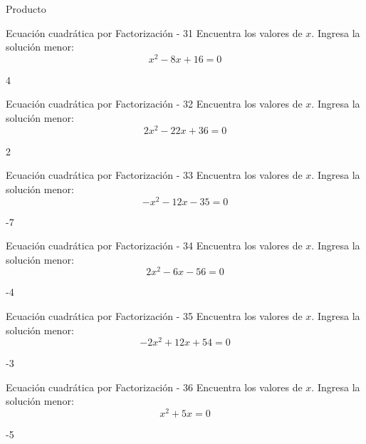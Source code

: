 \documentclass[a4,11pt]{aleph-notas}
\begin{document}
\begin{quiz}{Producto}
\begin{numerical}[]%
    {Ecuación cuadrática por Factorización - 31}
    Encuentra los valores de $x$. Ingresa la solución menor:
    \[
        x^{2} - 8 x + 16 = 0
    \]
    \item[] 4
\end{numerical}

\begin{numerical}[]%
    {Ecuación cuadrática por Factorización - 32}
    Encuentra los valores de $x$. Ingresa la solución menor:
    \[
        2 x^{2} - 22 x + 36 = 0
    \]
    \item[] 2
\end{numerical}

\begin{numerical}[]%
    {Ecuación cuadrática por Factorización - 33}
    Encuentra los valores de $x$. Ingresa la solución menor:
    \[
        - x^{2} - 12 x - 35 = 0
    \]
    \item[] -7
\end{numerical}

\begin{numerical}[]%
    {Ecuación cuadrática por Factorización - 34}
    Encuentra los valores de $x$. Ingresa la solución menor:
    \[
        2 x^{2} - 6 x - 56 = 0
    \]
    \item[] -4
\end{numerical}

\begin{numerical}[]%
    {Ecuación cuadrática por Factorización - 35}
    Encuentra los valores de $x$. Ingresa la solución menor:
    \[
        - 2 x^{2} + 12 x + 54 = 0
    \]
    \item[] -3
\end{numerical}

\begin{numerical}[]%
    {Ecuación cuadrática por Factorización - 36}
    Encuentra los valores de $x$. Ingresa la solución menor:
    \[
        x^{2} + 5 x = 0
    \]
    \item[] -5
\end{numerical}


\end{quiz}
\end{document}

